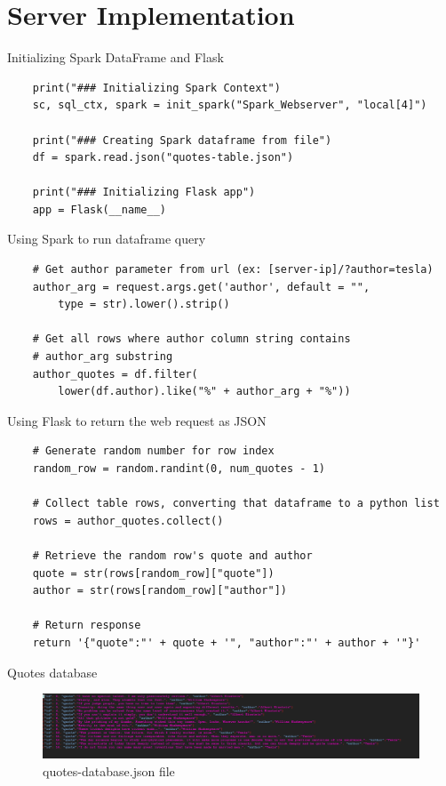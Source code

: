 \section{Server Implementation}
 
\frame{\sectionpage}
 
\begin{frame}[fragile]{Initializing Spark DataFrame and Flask}
	\begin{verbatim}
	print("### Initializing Spark Context")
	sc, sql_ctx, spark = init_spark("Spark_Webserver", "local[4]")
	
	print("### Creating Spark dataframe from file")
	df = spark.read.json("quotes-table.json")
	
	print("### Initializing Flask app")
	app = Flask(__name__)
	\end{verbatim}
\end{frame}
	
\begin{frame}[fragile]{Using Spark to run dataframe query}
	\begin{verbatim}
	# Get author parameter from url (ex: [server-ip]/?author=tesla)
	author_arg = request.args.get('author', default = "", 
	    type = str).lower().strip()
	
	# Get all rows where author column string contains 
	# author_arg substring
	author_quotes = df.filter(
	    lower(df.author).like("%" + author_arg + "%"))
	\end{verbatim}
\end{frame}

\begin{frame}[fragile]{Using Flask to return the web request as JSON}
	\begin{verbatim}
	# Generate random number for row index
	random_row = random.randint(0, num_quotes - 1)
	
	# Collect table rows, converting that dataframe to a python list
	rows = author_quotes.collect()
	
	# Retrieve the random row's quote and author
	quote = str(rows[random_row]["quote"])
	author = str(rows[random_row]["author"])
	
	# Return response
	return '{"quote":"' + quote + '", "author":"' + author + '"}'
	\end{verbatim}
\end{frame}

\begin{frame}{Quotes database}
	\begin{figure}
		\centering
		\includegraphics[width =1\linewidth]{robot-spark-proj/quotes-table.PNG}
		\caption{quotes-database.json file}
	\end{figure}
	
\end{frame}

